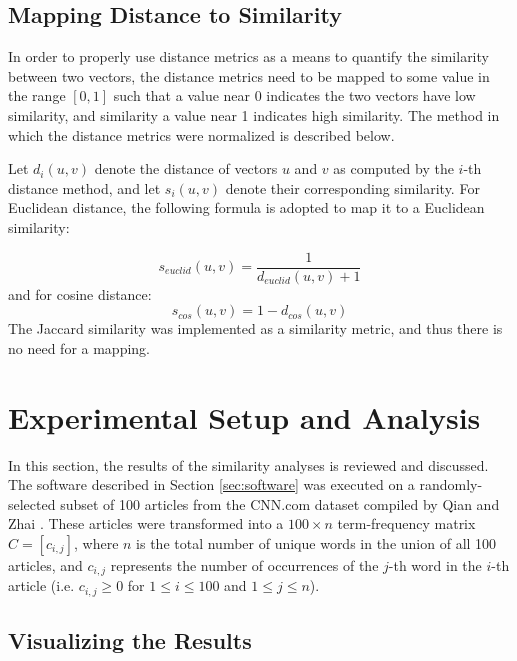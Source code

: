 \documentclass[11pt]{article}
\begin{document}
\subsection{Mapping Distance to Similarity} \label{sec:mapping}

In order to properly use distance metrics as a means to quantify the similarity between two vectors, the distance metrics need to be mapped to some value in the range $[0, 1]$ such that a value near 0 indicates the two vectors have low similarity, and similarity a value near 1 indicates high similarity.
The method in which the distance metrics were normalized is described below.

Let $d_i(u, v)$ denote the distance of vectors $u$ and $v$ as computed by the $i$-th distance method, and let $s_i(u, v)$ denote their corresponding similarity.
For Euclidean distance, the following formula is adopted to map it to a Euclidean similarity:

\begin{equation} \label{eq:euclid}
s_{euclid}(u, v) = \frac{1}{d_{euclid}(u, v) + 1}
\end{equation}
and for cosine distance:
\begin{equation} \label{eq:cosine}
s_{cos}(u, v) = 1 - d_{cos}(u, v)
\end{equation}
The Jaccard similarity was implemented as a similarity metric, and thus there is no need for a mapping.


\section{Experimental Setup and Analysis} \label{sec:experiments}

In this section, the results of the similarity analyses is reviewed and discussed.
The software described in Section \ref{sec:software} was executed on a randomly-selected subset of 100 articles from the CNN.com dataset compiled by Qian and Zhai \cite{qian2014unsupervised}.
These articles were transformed into a $100 \times n$ term-frequency matrix $C = [ c_{i,j} ]$, where $n$ is the total number of unique words in the union of all 100 articles, and $c_{i,j}$ represents the number of occurrences of the $j$-th word in the $i$-th article (i.e. $c_{i,j} \ge 0$ for $1 \le i \le 100$ and $1 \le j \le n$).


\subsection{Visualizing the Results}
\end{document}

